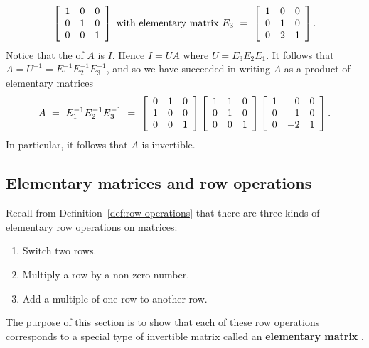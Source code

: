 \documentclass{ximera}
\begin{document}
\begin{solution}
\begin{equation*}
    \startmat{rrr}
      1 & 0 & 0 \\
      0 & 1 & 0 \\
      0 & 0 & 1 \\
    \stopmat
    \quad\mbox{with elementary matrix}\quad
    E_3 ~=~ \startmat{rrr}
      1 & 0 & 0 \\
      0 & 1 & 0 \\
      0 & 2 & 1 \\
    \stopmat.
  \end{equation*}
  Notice that the {\rref} of $A$ is $I$. Hence $I = UA$ where
  $U=E_3E_2E_1$. It follows that
  $A = U^{-1} = E_1^{-1}E_2^{-1}E_3^{-1}$, and so we have succeeded in
  writing $A$ as a product of elementary matrices
  \begin{equation*}
    A
    ~=~ E_1^{-1}E_2^{-1}E_3^{-1}
    ~=~
    \startmat{rrr}
      0 & 1 & 0 \\
      1 & 0 & 0 \\
      0 & 0 & 1
    \stopmat
    \startmat{rrr}
      1 & 1 & 0 \\
      0 & 1 & 0 \\
      0 & 0 & 1
    \stopmat
    \startmat{rrr}
      1 & 0 & 0 \\
      0 & 1 & 0 \\
      0 & -2 & 1
    \stopmat.
  \end{equation*}
  In particular, it follows that $A$ is invertible.
\end{solution}

\subsection*{Elementary matrices and row operations}

Recall from Definition~\ref{def:row-operations} that there are three
kinds of elementary row operations%
%
%
%
 on matrices:
\begin{enumerate}
\item Switch two rows.
\item Multiply a row by a non-zero number.
\item Add a multiple of one row to another row.
\end{enumerate}
The purpose of this section is to show that each of these row
operations corresponds to a special type of invertible matrix called
an \textbf{elementary matrix}%
%
.
\end{document}
